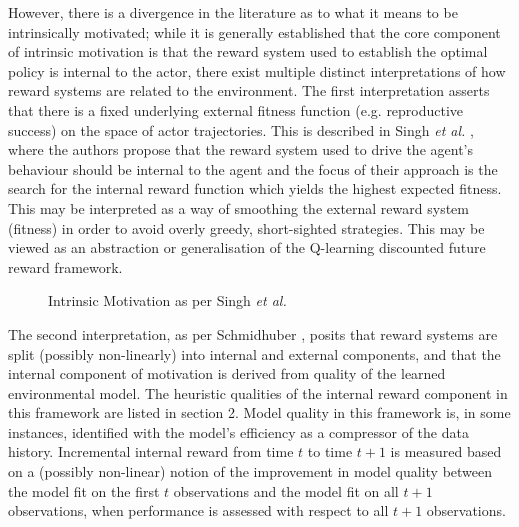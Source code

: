 \documentclass{article}
\begin{document}
However, there is a divergence in the literature as to what it means to be intrinsically motivated; while it is generally established that the core component of intrinsic motivation is that the reward system used to establish the optimal policy is internal to the actor, there exist multiple distinct interpretations of how reward systems are related to the environment. The first interpretation asserts that there is a fixed underlying external fitness function (e.g. reproductive success) on the space of actor trajectories. This is described in Singh \textit{et al.} \cite{singh2010intrinsically}, where the authors propose that the reward system used to drive the agent's behaviour should be internal to the agent and the focus of their approach is the search for the internal reward function which yields the highest expected fitness. This may be interpreted as a way of smoothing the external reward system (fitness) in order to avoid overly greedy, short-sighted strategies. This may be viewed as an abstraction or generalisation of the Q-learning discounted future reward framework.
 
\begin{figure}[h]
\centering
{}
\caption{Intrinsic Motivation as per Singh \textit{et al.}} \label{fig:M1}
\end{figure}

The second interpretation, as per Schmidhuber \cite{schmidhuber2010formal}, posits that reward systems are split (possibly non-linearly) into internal and external components, and that the internal component of motivation is derived from quality of the learned environmental model. The heuristic qualities of the internal reward component in this framework are listed in section 2. Model quality in this framework is, in some instances, identified with the model's efficiency as a compressor of the data history. Incremental internal reward from time $t$ to time $t+1$ is measured based on a (possibly non-linear) notion of the improvement in model quality between the model fit on the first $t$ observations and the model fit on all $t+1$ observations, when performance is assessed with respect to all $t+1$ observations.
\end{document}
